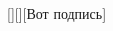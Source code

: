 \documentclass[12pt,a4paper]{article}
\begin{document}
\begin{task}{2}
\end{task}

[][][Вот подпись] %


\begin{solution}
    
\end{solution}
\end{document}

